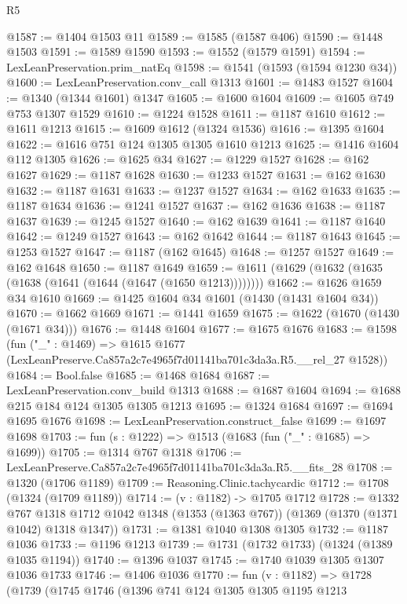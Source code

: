\begin{lexlean}{R5}
\begin{coremodule}
@1587 := @1404 @1503 @11
@1589 := @1585 (@1587 @406)
@1590 := @1448 @1503
@1591 := @1589 @1590
@1593 := @1552 (@1579 @1591)
@1594 := LexLeanPreservation.prim_natEq
@1598 := @1541 (@1593 (@1594 @1230 @34))
@1600 := LexLeanPreservation.conv_call @1313
@1601 := @1483 @1527
@1604 := @1340 (@1344 @1601) @1347
@1605 := @1600 @1604
@1609 := @1605 @749 @753 @1307 @1529
@1610 := @1224 @1528
@1611 := @1187 @1610
@1612 := @1611 @1213
@1615 := @1609 @1612 (@1324 @1536)
@1616 := @1395 @1604
@1622 := @1616 @751 @124 @1305 @1305 @1610 @1213
@1625 := @1416 @1604 @112 @1305
@1626 := @1625 @34
@1627 := @1229 @1527
@1628 := @162 @1627
@1629 := @1187 @1628
@1630 := @1233 @1527
@1631 := @162 @1630
@1632 := @1187 @1631
@1633 := @1237 @1527
@1634 := @162 @1633
@1635 := @1187 @1634
@1636 := @1241 @1527
@1637 := @162 @1636
@1638 := @1187 @1637
@1639 := @1245 @1527
@1640 := @162 @1639
@1641 := @1187 @1640
@1642 := @1249 @1527
@1643 := @162 @1642
@1644 := @1187 @1643
@1645 := @1253 @1527
@1647 := @1187 (@162 @1645)
@1648 := @1257 @1527
@1649 := @162 @1648
@1650 := @1187 @1649
@1659 := @1611 (@1629 (@1632 (@1635 (@1638 (@1641 (@1644 (@1647 (@1650 @1213))))))))
@1662 := @1626 @1659 @34 @1610
@1669 := @1425 @1604 @34 @1601 (@1430 (@1431 @1604 @34))
@1670 := @1662 @1669
@1671 := @1441 @1659
@1675 := @1622 (@1670 (@1430 (@1671 @34)))
@1676 := @1448 @1604
@1677 := @1675 @1676
@1683 := @1598
    (fun ("_" : @1469) =>
    @1615 @1677 (LexLeanPreserve.Ca857a2c7e4965f7d01141ba701c3da3a.R5.__rel_27 @1528))
@1684 := Bool.false
@1685 := @1468 @1684
@1687 := LexLeanPreservation.conv_build @1313
@1688 := @1687 @1604
@1694 := @1688 @215 @184 @124 @1305 @1305 @1213
@1695 := @1324 @1684
@1697 := @1694 @1695 @1676
@1698 := LexLeanPreservation.construct_false
@1699 := @1697 @1698
@1703 := fun (s : @1222) => @1513 (@1683 (fun ("_" : @1685) => @1699))
@1705 := @1314 @767 @1318
@1706 := LexLeanPreserve.Ca857a2c7e4965f7d01141ba701c3da3a.R5.__fits_28
@1708 := @1320 (@1706 @1189)
@1709 := Reasoning.Clinic.tachycardic
@1712 := @1708 (@1324 (@1709 @1189))
@1714 := (v : @1182) -> @1705 @1712
@1728 := @1332
    @767
    @1318
    @1712
    @1042
    @1348
    (@1353 (@1363 @767))
    (@1369 (@1370 (@1371 @1042) @1318 @1347))
@1731 := @1381 @1040 @1308 @1305
@1732 := @1187 @1036
@1733 := @1196 @1213
@1739 := @1731 (@1732 @1733) (@1324 (@1389 @1035 @1194))
@1740 := @1396 @1037
@1745 := @1740 @1039 @1305 @1307 @1036 @1733
@1746 := @1406 @1036
@1770 := fun (v : @1182) =>
  @1728
    (@1739
      (@1745
        @1746
        (@1396
          @741
          @124
          @1305
          @1305
          @1195
          @1213

\end{coremodule}
\end{lexlean}
